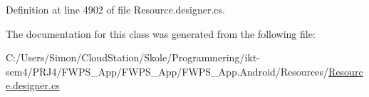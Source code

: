 Definition at line 4902 of file Resource.\+designer.\+cs.



The documentation for this class was generated from the following file\+:\begin{DoxyCompactItemize}
\item 
C\+:/\+Users/\+Simon/\+Cloud\+Station/\+Skole/\+Programmering/ikt-\/sem4/\+P\+R\+J4/\+F\+W\+P\+S\+\_\+\+App/\+F\+W\+P\+S\+\_\+\+App/\+F\+W\+P\+S\+\_\+\+App.\+Android/\+Resources/\mbox{\hyperlink{_resource_8designer_8cs}{Resource.\+designer.\+cs}}\end{DoxyCompactItemize}
